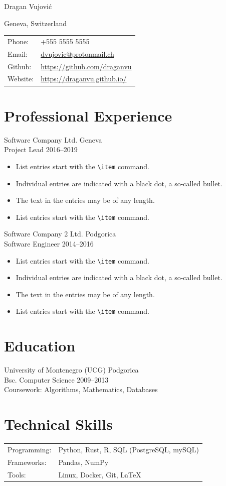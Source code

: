 \documentclass[11pt, a4paper]{article}
\newcommand{\myname}{Dragan Vujović}
\begin{document}
\begin{Huge}
  \myname
\end{Huge}

\medskip Geneva, Switzerland

\vspace{1pt}
\begin{tabular}{@{} l l }
  Phone: & +555 5555 5555\\
  Email: & \href{mailto:dvujovic@protonmail.ch}{dvujovic@protonmail.ch}\\
  Github: & \href{https://github.com/draganvu}{https://github.com/draganvu}\\
  Website: & \href{https://draganvu.github.io/}{https://draganvu.github.io/}
\end{tabular}
  
\section*{Professional Experience}
Software Company Ltd. \hfill Geneva\\
Project Lead \hfill 2016--2019
\begin{itemize}
  \item List entries start with the \verb|\item| command.
  \item Individual entries are indicated with a black dot, a so-called bullet.
  \item The text in the entries may be of any length.
  \item List entries start with the \verb|\item| command.
\end{itemize}
 
Software Company 2 Ltd. \hfill Podgorica\\
Software Engineer \hfill 2014--2016
\begin{itemize}
  \item List entries start with the \verb|\item| command.
  \item Individual entries are indicated with a black dot, a so-called bullet.
  \item The text in the entries may be of any length.
  \item List entries start with the \verb|\item| command.
\end{itemize}

\section*{Education}
University of Montenegro (UCG) \hfill Podgorica\\
Bsc. Computer Science \hfill 2009--2013\\
Coursework: Algorithms, Mathematics, Databases

\section*{Technical Skills}
\begin{tabular}{@{} l l }
  Programming: & Python, Rust, R, SQL (PostgreSQL, mySQL)\\
  Frameworks: & Pandas, NumPy\\
  Tools: & Linux, Docker, Git, \LaTeX
\end{tabular}
\end{document}
